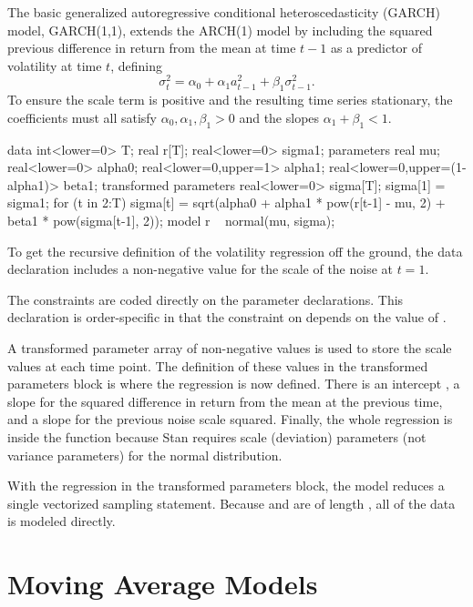 The basic generalized autoregressive conditional heteroscedasticity
(GARCH) model, GARCH(1,1), extends the ARCH(1) model by including the
squared previous difference in return from the mean at time $t-1$ as a
predictor of volatility at time $t$, defining
%
\[
\sigma^2_t = \alpha_0 + \alpha_1 a^2_{t-1} + \beta_1 \sigma^2_{t-1}.
\]
%
To ensure the scale term is positive and the resulting time series
stationary, the coefficients must all satisfy $\alpha_0, \alpha_1,
\beta_1 > 0$ and the slopes $\alpha_1 + \beta_1 < 1$.
%
\begin{stancode}
data {
  int<lower=0> T;
  real r[T];
  real<lower=0> sigma1;
}
parameters {
  real mu;
  real<lower=0> alpha0;
  real<lower=0,upper=1> alpha1;
  real<lower=0,upper=(1-alpha1)> beta1;
}
transformed parameters {
  real<lower=0> sigma[T];
  sigma[1] = sigma1;
  for (t in 2:T)
    sigma[t] = sqrt(alpha0
                     + alpha1 * pow(r[t-1] - mu, 2)
                     + beta1 * pow(sigma[t-1], 2));
}
model {
  r ~ normal(mu, sigma);
}
\end{stancode}
%
To get the recursive definition of the volatility regression off the
ground, the data declaration includes a non-negative value
 for the scale of the noise at $t = 1$.

The constraints are coded directly on the parameter declarations.
This declaration is order-specific in that the constraint on 
depends on the value of .

A transformed parameter array of non-negative values  is
used to store the scale values at each time point.  The definition of
these values in the transformed parameters block is where the
regression is now defined.  There is an intercept , a
slope  for the squared difference in return from the mean
at the previous time, and a slope  for the previous noise
scale squared.  Finally, the whole regression is inside the
 function because Stan requires scale (deviation) parameters (not
variance parameters) for the normal distribution.

With the regression in the transformed parameters block, the model
reduces a single vectorized sampling statement.  Because  and
 are of length , all of the data is modeled
directly.


\section{Moving Average Models}

